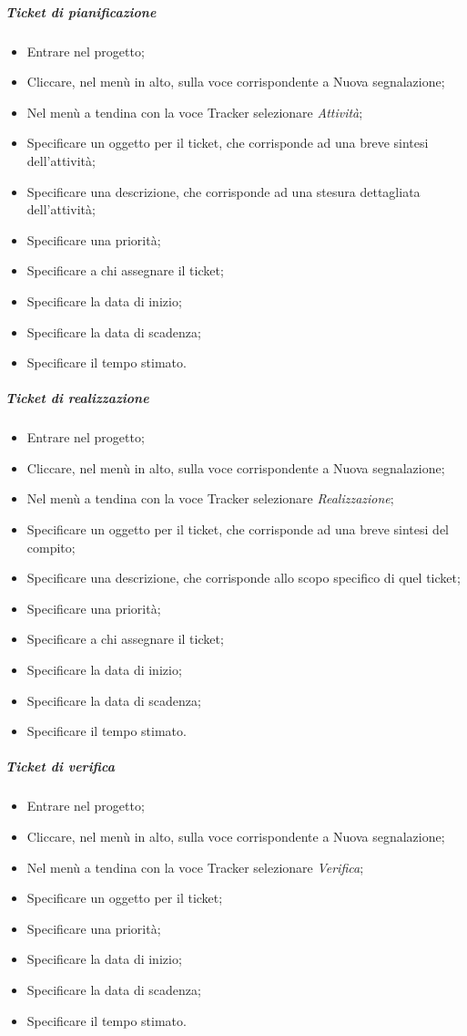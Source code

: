 \subparagraph{Ticket di pianificazione}
\begin{itemize}
\item Entrare nel progetto;
\item Cliccare, nel menù in alto, sulla voce corrispondente a Nuova segnalazione;
\item Nel menù a tendina con la voce Tracker selezionare \textit{Attività};
\item Specificare un oggetto per il ticket, che corrisponde ad una breve sintesi dell'attività;
\item Specificare una descrizione, che corrisponde ad una stesura dettagliata dell'attività;
\item Specificare una priorità;
\item Specificare a chi assegnare il ticket;
\item Specificare la data di inizio;
\item Specificare la data di scadenza;
\item Specificare il tempo stimato.
\end{itemize}

\subparagraph{Ticket di realizzazione}
\begin{itemize}
\item Entrare nel progetto;
\item Cliccare, nel menù in alto, sulla voce corrispondente a Nuova segnalazione;
\item Nel menù a tendina con la voce Tracker selezionare \textit{Realizzazione};
\item Specificare un oggetto per il ticket, che corrisponde ad una breve sintesi del compito;
\item Specificare una descrizione, che corrisponde allo scopo specifico di quel ticket;
\item Specificare una priorità;
\item Specificare a chi assegnare il ticket;
\item Specificare la data di inizio;
\item Specificare la data di scadenza;
\item Specificare il tempo stimato.
\end{itemize}

\subparagraph{Ticket di verifica}
\label{ticket_verifica}
\begin{itemize}
\item Entrare nel progetto;
\item Cliccare, nel menù in alto, sulla voce corrispondente a Nuova segnalazione;
\item Nel menù a tendina con la voce Tracker selezionare \textit{Verifica};
\item Specificare un oggetto per il ticket;
\item Specificare una priorità;
\item Specificare la data di inizio;
\item Specificare la data di scadenza;
\item Specificare il tempo stimato.
\end{itemize}


